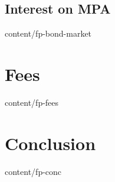 \documentclass[conference,final,10pt,a4paper]{IEEEtran}
\begin{document}
\subsection    { Interest on MPA                                 }  { content/fp-bond-market         } 

\section       { Fees                                            }  { content/fp-fees                }

\section       { Conclusion                                      }  { content/fp-conc                } 


\end{document}
